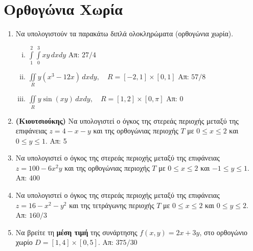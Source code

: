 



\geometry{top=2cm}
\pagestyle{askhseis}
\everymath{\displaystyle}




\begin{center}
  \minibox{\large\bf \textcolor{Col1}{Ασκήσεις Διπλό Ολοκλήρωμα}}
\end{center}


\section*{Ορθογώνια Χωρία}

\begin{enumerate}
  \item Να υπολογιστούν τα παρακάτω διπλά ολοκληρώματα (ορθογώνια χωρία).
    \begin{enumerate}[i)]
      \item $\int\limits_1^2\!\!\!\int\limits_0^ 3xy\,dxdy$ 
        \hfill Απ: ${27}/{4}$ %
      \item $\iint\limits_{R}y(x^3-12x)\,dxdy,\quad R=[-2,1]\times[0,1]$ 
        \hfill Απ: ${57}/{8}$
      \item $ \iint\limits_{R}y\sin(xy)\,dxdy, \quad R=[1,2]\times[0,\pi] $ 
        \hfill Απ: $ 0 $ 
    \end{enumerate}

  \item \textbf{(Κιουτσιούκης)} Να υπολογιστεί ο όγκος της στερεάς περιοχής μεταξύ 
    της επιφάνειας $ z=4-x-y $ και της ορθογώνιας περιοχής $T$ με $ 0 \leq x \leq 2 $ 
    και $ 0 \leq y \leq 1 $. \hfill Απ: 5  

  \item Να υπολογιστεί ο όγκος της στερεάς περιοχής μεταξύ της επιφάνειας 
    $ z = 100 - 6x^{2}y $ και της ορθογώνιας περιοχής $T$ με 
    $ 0 \leq x \leq 2 $ και $ -1 \leq y \leq 1 $. \hfill Απ: $400$ 

  \item Να υπολογιστεί ο όγκος της στερεάς περιοχής μεταξύ της 
    επιφάνειας $ z= 16-x^{2}-y^{2} $ και της τετράγωνης περιοχής $T$ με 
    $ 0 \leq x \leq 2 $ και $ 0 \leq y \leq 2 $. \hfill Απ: $160/3$ 

  \item Να βρείτε τη \textbf{μέση τιμή} της συνάρτησης $ f(x,y)=2x+3y $, στο 
    ορθογώνιο χωρίο $D= [1,4] \times [0,5]$.
    \hfill Απ: $ {375}/{30} $ 


\end{enumerate}
